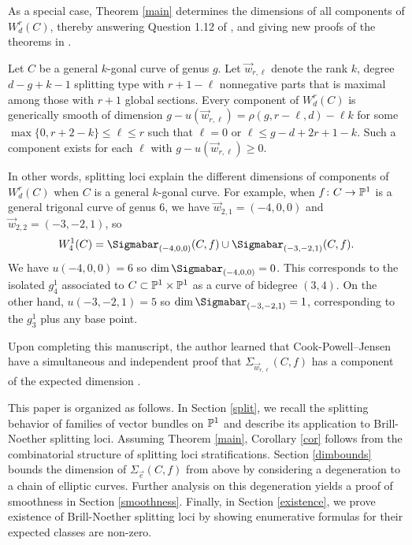 As a special case, Theorem \ref{main} determines the dimensions of all components of $W^r_d(C)$, thereby answering Question 1.12 of \cite{Pf}, and giving new proofs of the theorems in \cite{JR,Pf}.
\begin{Corollary}
\notready \label{cor}
Let $C$ be a general $k$-gonal curve of genus $g$. Let $\vec{w}_{r, \ell}$ denote the rank $k$, degree $d - g +k-1$ splitting type with $r+1 - \ell$ nonnegative parts that is maximal among those with $r+1$ global sections.
Every component of $W^r_d(C)$ is generically smooth of dimension $g - u(\vec{w}_{r,\ell}) = \rho(g, r - \ell, d) - \ell k $ for some $\max\{0, r + 2 - k\} \leq \ell \leq r$ such that $\ell = 0$ or $\ell \leq  g - d + 2r + 1 - k$.
Such a component exists for each $\ell$ with $g - u(\vec{w}_{r,\ell})  \geq 0$.
\end{Corollary}

In other words, splitting loci explain the different dimensions of components of $W^r_d(C)$ when $C$ is a general $k$-gonal curve.
For example, when $f\colon  C \rightarrow \mathbb{P}^1$ is a general trigonal curve of genus $6$, we have $\vec{w}_{2,1} = (-4, 0, 0)$ and $\vec{w}_{2,2} = (-3, -2, 1)$, so
\[W^1_4(C) = \Sigmabar_{(-4, 0, 0)}(C, f) \cup \Sigmabar_{(-3, -2, 1)}(C, f).\]
We have $u(-4, 0, 0) = 6$ so $\dim \Sigmabar_{(-4, 0, 0)} = 0$. This corresponds to the isolated $g^1_4$ associated to $C \subset \mathbb{P}^1 \times \mathbb{P}^1$ as a curve of bidegree $(3, 4)$. On the other hand, $u(-3, -2, 1) = 5$ so $\dim \Sigmabar_{(-3, -2, 1)} = 1$, corresponding to the $g^1_3$ plus any base point.

\begin{remark}
\notready
Upon completing this manuscript, the author learned that Cook-Powell--Jensen have a simultaneous and independent proof that $\Sigma_{\vec{w}_{r,\ell}}(C, f)$ has a component of the expected dimension \cite{CPJ}.
\end{remark}

This paper is organized as follows. In Section \ref{split}, we recall the splitting behavior of families of vector bundles on $\mathbb{P}^1$ and describe its application to Brill-Noether splitting loci. Assuming Theorem \ref{main}, Corollary \ref{cor} follows from the combinatorial structure of splitting loci stratifications. Section \ref{dimbounds} bounds the dimension of $\Sigma_{\vec{e}}(C, f)$ from above by considering a degeneration to a chain of elliptic curves. Further analysis on this degeneration yields a proof of smoothness in Section \ref{smoothness}.
 Finally, in Section \ref{existence}, we prove existence of Brill-Noether splitting loci by showing enumerative formulas for their expected classes are non-zero.


